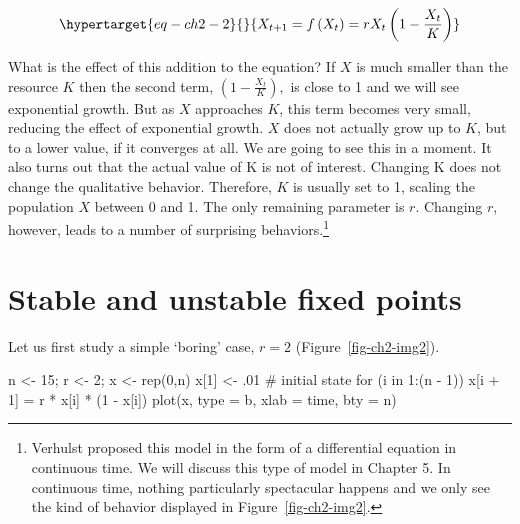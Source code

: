 \documentclass[
  letterpaper,
]{scrbook}
\newenvironment{Shaded}{\begin{snugshade}}{\end{snugshade}}
\newcommand{\AttributeTok}[1]{\textcolor[rgb]{0.40,0.45,0.13}{#1}}
\newcommand{\CommentTok}[1]{\textcolor[rgb]{0.37,0.37,0.37}{#1}}
\newcommand{\ControlFlowTok}[1]{\textcolor[rgb]{0.00,0.23,0.31}{#1}}
\newcommand{\DecValTok}[1]{\textcolor[rgb]{0.68,0.00,0.00}{#1}}
\newcommand{\FunctionTok}[1]{\textcolor[rgb]{0.28,0.35,0.67}{#1}}
\newcommand{\NormalTok}[1]{\textcolor[rgb]{0.00,0.23,0.31}{#1}}
\newcommand{\OtherTok}[1]{\textcolor[rgb]{0.00,0.23,0.31}{#1}}
\newcommand{\SpecialCharTok}[1]{\textcolor[rgb]{0.37,0.37,0.37}{#1}}
\newcommand{\StringTok}[1]{\textcolor[rgb]{0.13,0.47,0.30}{#1}}
\begin{document}
\begin{equation}\protect\hypertarget{eq-ch2-2}{}{
X_{t + 1} = f\left( X_{t} \right) = rX_{t}\left( 1 - \frac{X_{t}}{K} \right)}\label{eq-ch2-2}\end{equation}

What is the effect of this addition to the equation? If \(X\) is much
smaller than the resource \(K\) then the second term,
\(\left( 1 - \frac{X_{t}}{K} \right),\) is close to 1 and we will see
exponential growth. But as \(X\) approaches \(K\), this term becomes
very small, reducing the effect of exponential growth. \(X\) does not
actually grow up to \(K\), but to a lower value, if it converges at all.
We are going to see this in a moment. It also turns out that the actual
value of K is not of interest. Changing K does not change the
qualitative behavior. Therefore, \(K\) is usually set to 1, scaling the
population \(X\) between 0 and 1. The only remaining parameter is \(r\).
Changing \(r\), however, leads to a number of surprising
behaviors.\footnote{Verhulst proposed this model in the form of a
  differential equation in continuous time. We will discuss this type of
  model in Chapter 5. In continuous time, nothing particularly
  spectacular happens and we only see the kind of behavior displayed in
  Figure~\ref{fig-ch2-img2}.}

\hypertarget{stable-and-unstable-fixed-points}{%
\section{Stable and unstable fixed
points}\label{stable-and-unstable-fixed-points}}

Let us first study a simple `boring' case, \(r = 2\)
(Figure~\ref{fig-ch2-img2}).

\begin{Shaded}
\begin{Highlighting}[]
\NormalTok{n }\OtherTok{\textless{}{-}} \DecValTok{15}\NormalTok{; r }\OtherTok{\textless{}{-}} \DecValTok{2}\NormalTok{; x }\OtherTok{\textless{}{-}} \FunctionTok{rep}\NormalTok{(}\DecValTok{0}\NormalTok{,n)}
\NormalTok{x[}\DecValTok{1}\NormalTok{] }\OtherTok{\textless{}{-}}\NormalTok{ .}\DecValTok{01} \CommentTok{\# initial state}
\ControlFlowTok{for}\NormalTok{ (i }\ControlFlowTok{in} \DecValTok{1}\SpecialCharTok{:}\NormalTok{(n }\SpecialCharTok{{-}} \DecValTok{1}\NormalTok{))}
\NormalTok{  x[i }\SpecialCharTok{+} \DecValTok{1}\NormalTok{] }\OtherTok{=}\NormalTok{ r }\SpecialCharTok{*}\NormalTok{ x[i] }\SpecialCharTok{*}\NormalTok{ (}\DecValTok{1} \SpecialCharTok{{-}}\NormalTok{ x[i])}
\FunctionTok{plot}\NormalTok{(x, }\AttributeTok{type =} \StringTok{\textquotesingle{}b\textquotesingle{}}\NormalTok{, }\AttributeTok{xlab =} \StringTok{\textquotesingle{}time\textquotesingle{}}\NormalTok{, }\AttributeTok{bty =} \StringTok{\textquotesingle{}n\textquotesingle{}}\NormalTok{)}
\end{Highlighting}
\end{Shaded}
\end{document}
